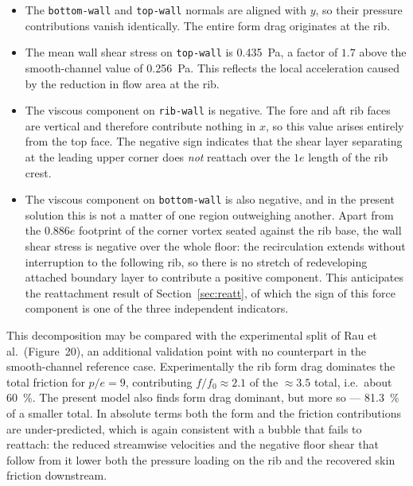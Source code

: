 \documentclass[11pt,a4paper]{article}
\begin{document}
\begin{itemize}
  \item The \texttt{bottom-wall} and \texttt{top-wall} normals are aligned
  with $y$, so their pressure contributions vanish identically. The entire
  form drag originates at the rib.

  \item The mean wall shear stress on \texttt{top-wall} is
  \SI{0.435}{\pascal}, a factor of $1.7$ above the smooth-channel value of
  \SI{0.256}{\pascal}. This reflects the local acceleration caused by the
  reduction in flow area at the rib.

  \item The viscous component on \texttt{rib-wall} is negative. The fore and
  aft rib faces are vertical and therefore contribute nothing in $x$, so
  this value arises entirely from the top face. The negative sign indicates
  that the shear layer separating at the leading upper corner does
  \emph{not} reattach over the $1e$ length of the rib crest.

  \item The viscous component on \texttt{bottom-wall} is also negative, and
  in the present solution this is not a matter of one region outweighing
  another. Apart from the $0.886e$ footprint of the corner vortex seated
  against the rib base, the wall shear stress is negative over the whole
  floor: the recirculation extends without interruption to the following
  rib, so there is no stretch of redeveloping attached boundary layer to
  contribute a positive component. This anticipates the reattachment result
  of Section~\ref{sec:reatt}, of which the sign of this force
  component is one of the three independent indicators.
\end{itemize}

This decomposition may be compared with the experimental split of
Rau et al.\ (Figure~20), an additional validation point with no counterpart
in the smooth-channel reference case. Experimentally the rib form drag
dominates the total friction for $p/e = 9$, contributing $f/f_{0} \approx 2.1$
of the $\approx 3.5$ total, i.e.\ about \SI{60}{\percent}. The present model
also finds form drag dominant, but more so --- \SI{81.3}{\percent} of a
smaller total. In absolute terms both the form and the friction
contributions are under-predicted, which is again consistent with a bubble
that fails to reattach: the reduced streamwise velocities and the negative
floor shear that follow from it lower both the pressure loading on the rib
and the recovered skin friction downstream.
\end{document}
